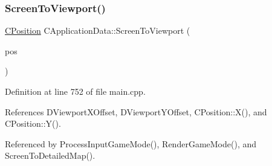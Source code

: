 \subsubsection{\texorpdfstring{Screen\+To\+Viewport()}{ScreenToViewport()}}
{\footnotesize\ttfamily \hyperlink{classCPosition}{C\+Position} C\+Application\+Data\+::\+Screen\+To\+Viewport (\begin{DoxyParamCaption}\item[{const \hyperlink{classCPosition}{C\+Position} \&}]{pos }\end{DoxyParamCaption})\hspace{0.3cm}{\ttfamily [protected]}}



Definition at line 752 of file main.\+cpp.



References D\+Viewport\+X\+Offset, D\+Viewport\+Y\+Offset, C\+Position\+::\+X(), and C\+Position\+::\+Y().



Referenced by Process\+Input\+Game\+Mode(), Render\+Game\+Mode(), and Screen\+To\+Detailed\+Map().



